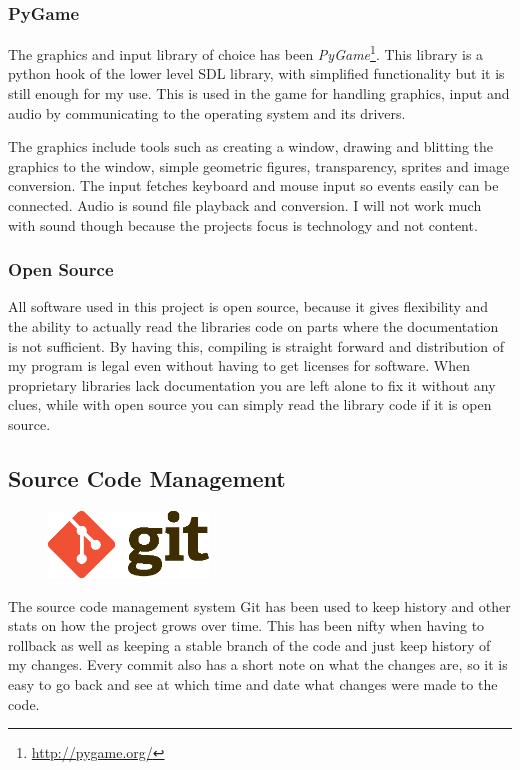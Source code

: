 \documentclass[a4paper,12pt]{article}
\begin{document}
\subsubsection{PyGame}
The graphics and input library of choice has been \emph{PyGame}\footnote{\url{http://pygame.org/}}. 
This library is a python hook of the lower level SDL library, with simplified functionality but it is still enough for my use.
This is used in the game for handling graphics, input and audio by communicating to the operating system and its drivers.

The graphics include tools such as creating a window, drawing and blitting the graphics to the window, simple geometric figures, transparency, sprites and image conversion.
The input fetches keyboard and mouse input so events easily can be connected.
Audio is sound file playback and conversion. I will not work much with sound though because the projects focus is technology and not content.

\subsubsection{Open Source}
All software used in this project is open source, because it gives flexibility and the ability to actually read the libraries code on parts where the documentation is not sufficient.
By having this, compiling is straight forward and distribution of my program is legal even without having to get licenses for software. 
When proprietary libraries lack documentation you are left alone to fix it without any clues, while with open source you can simply read the library code if it is open source.

\subsection{Source Code Management}
\begin{figure}
    \vspace{-20pt}
    \begin{center}
        \includegraphics[width=0.38\textwidth]{img/git-logo.eps}
    \end{center}
    \vspace{-20pt}
\end{figure}
The source code management system Git has been used to keep history and other stats on how the project grows over time.
This has been nifty when having to rollback as well as keeping a stable branch of the code and just keep history of my changes.
Every commit also has a short note on what the changes are, so it is easy to go back and see at which time and date what changes were made to the code.
\end{document}
